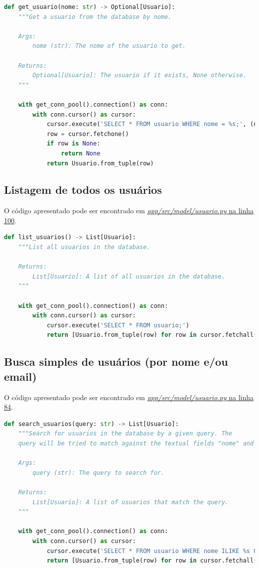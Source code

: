 \begin{lstlisting}[language=Python,caption={Obtenção de usuário},label={lst:obtencao_usuario}]
def get_usuario(nome: str) -> Optional[Usuario]:
    """Get a usuario from the database by nome.

    Args:
        nome (str): The nome of the usuario to get.

    Returns:
        Optional[Usuario]: The usuario if it exists, None otherwise.
    """
    
    with get_conn_pool().connection() as conn:
        with conn.cursor() as cursor:
            cursor.execute('SELECT * FROM usuario WHERE nome = %s;', (nome,))
            row = cursor.fetchone()
            if row is None:
                return None
            return Usuario.from_tuple(row)
\end{lstlisting}


\subsection{Listagem de todos os usuários}

O código apresentado pode ser encontrado em \href{}{\textit{app/src/model/usuario.py} na linha 100}.

\begin{lstlisting}[language=Python,caption={Listagem de usuários},label={lst:listagem_usuarios}]
def list_usuarios() -> List[Usuario]:
    """List all usuarios in the database.

    Returns:
        List[Usuario]: A list of all usuarios in the database.
    """
    
    with get_conn_pool().connection() as conn:
        with conn.cursor() as cursor:
            cursor.execute('SELECT * FROM usuario;')
            return [Usuario.from_tuple(row) for row in cursor.fetchall()]
\end{lstlisting}

\subsection{Busca simples de usuários (por nome e/ou email)}

O código apresentado pode ser encontrado em \href{}{\textit{app/src/model/usuario.py} na linha 84}.

\begin{lstlisting}[language=Python,caption={Busca simples de usuários},label={lst:busca_simples_usuarios}]
def search_usuarios(query: str) -> List[Usuario]:
    """Search for usuarios in the database by a given query. The
    query will be tried to match against the textual fields "nome" and "email".

    Args:
        query (str): The query to search for.
        
    Returns:
        List[Usuario]: A list of usuarios that match the query.
    """

    with get_conn_pool().connection() as conn:
        with conn.cursor() as cursor:
            cursor.execute('SELECT * FROM usuario WHERE nome ILIKE %s OR email ILIKE %s;', (f'%{query}%', f'%{query}%'))
            return [Usuario.from_tuple(row) for row in cursor.fetchall()]
\end{lstlisting}

